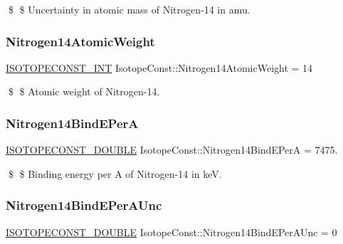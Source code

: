 \$ \$ Uncertainty in atomic mass of Nitrogen-\/14 in amu. \mbox{\label{group___isotope_const-_nitrogen-_n14_ga347d4bd26a283e446cd4c7cff111f90e}} 
\subsubsection{\texorpdfstring{Nitrogen14\+Atomic\+Weight}{Nitrogen14AtomicWeight}}
{\footnotesize\ttfamily \mbox{\hyperlink{group___isotope_const-_macros_ga5f18360b3e99483a35c32d789e62621c}{I\+S\+O\+T\+O\+P\+E\+C\+O\+N\+S\+T\+\_\+\+I\+NT}} Isotope\+Const\+::\+Nitrogen14\+Atomic\+Weight = 14}

\$ \$ Atomic weight of Nitrogen-\/14. \mbox{\label{group___isotope_const-_nitrogen-_n14_gaf6bd29ae6f65023d1816304ff01c2e9e}} 
\subsubsection{\texorpdfstring{Nitrogen14\+Bind\+E\+PerA}{Nitrogen14BindEPerA}}
{\footnotesize\ttfamily \mbox{\hyperlink{group___isotope_const-_macros_ga8f45a7272ce02c0b4c65c44636ed719a}{I\+S\+O\+T\+O\+P\+E\+C\+O\+N\+S\+T\+\_\+\+D\+O\+U\+B\+LE}} Isotope\+Const\+::\+Nitrogen14\+Bind\+E\+PerA = 7475.}

\$ \$ Binding energy per A of Nitrogen-\/14 in keV. \mbox{\label{group___isotope_const-_nitrogen-_n14_ga3a4d49a5af4e6c42e0ebc0a8f8d761a2}} 
\subsubsection{\texorpdfstring{Nitrogen14\+Bind\+E\+Per\+A\+Unc}{Nitrogen14BindEPerAUnc}}
{\footnotesize\ttfamily \mbox{\hyperlink{group___isotope_const-_macros_ga8f45a7272ce02c0b4c65c44636ed719a}{I\+S\+O\+T\+O\+P\+E\+C\+O\+N\+S\+T\+\_\+\+D\+O\+U\+B\+LE}} Isotope\+Const\+::\+Nitrogen14\+Bind\+E\+Per\+A\+Unc = 0}

